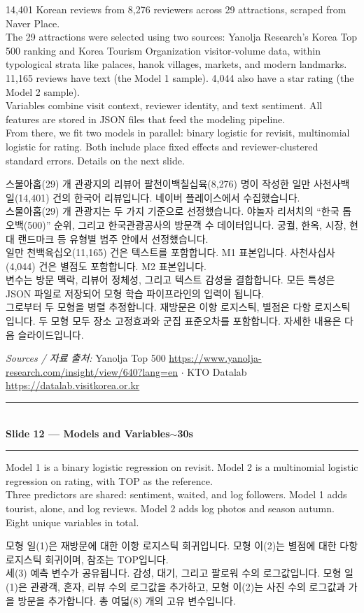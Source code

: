 \documentclass[10pt,a4paper]{article}
\newcommand{\sechead}[2]{%
  \vspace{6pt}%
  \noindent\rule{\linewidth}{0.6pt}\\[1pt]
  {\small\bfseries #1\hfill #2}\\[-3pt]
  \rule{\linewidth}{0.4pt}\par\vspace{2pt}%
}
\newcommand{\sent}[1]{#1\\[4pt]}
\newcommand{\bilingual}[2]{%
  \noindent%
  \begin{minipage}[t]{0.485\linewidth}
    \small #1
  \end{minipage}\hfill\vrule\hfill%
  \begin{minipage}[t]{0.483\linewidth}
    \small #2
  \end{minipage}\par\vspace{3pt}%
}
\begin{document}
\bilingual{%
\sent{14{,}401 Korean reviews from 8{,}276 reviewers across 29
attractions, scraped from Naver Place.}
\sent{The 29 attractions were selected using two sources: Yanolja
Research's Korea Top 500 ranking and Korea Tourism Organization
visitor-volume data, within typological strata like palaces, hanok
villages, markets, and modern landmarks.}
\sent{11{,}165 reviews have text (the Model 1 sample). 4{,}044 also have
a star rating (the Model 2 sample).}
\sent{Variables combine visit context, reviewer identity, and text
sentiment. All features are stored in JSON files that feed the modeling
pipeline.}
\sent{From there, we fit two models in parallel: binary logistic for
revisit, multinomial logistic for rating. Both include place fixed
effects and reviewer-clustered standard errors. Details on the next
slide.}
}{%
\sent{스물아홉(29) 개 관광지의 리뷰어 팔천이백칠십육(8{,}276) 명이
작성한 일만 사천사백일(14{,}401) 건의 한국어 리뷰입니다. 네이버
플레이스에서 수집했습니다.}
\sent{스물아홉(29) 개 관광지는 두 가지 기준으로 선정했습니다. 야놀자
리서치의 ``한국 톱 오백(500)'' 순위, 그리고 한국관광공사의 방문객 수
데이터입니다. 궁궐, 한옥, 시장, 현대 랜드마크 등 유형별 범주 안에서
선정했습니다.}
\sent{일만 천백육십오(11{,}165) 건은 텍스트를 포함합니다. M1 표본입니다.
사천사십사(4{,}044) 건은 별점도 포함합니다. M2 표본입니다.}
\sent{변수는 방문 맥락, 리뷰어 정체성, 그리고 텍스트 감성을 결합합니다.
모든 특성은 JSON 파일로 저장되어 모형 학습 파이프라인의 입력이 됩니다.}
\sent{그로부터 두 모형을 병렬 추정합니다. 재방문은 이항 로지스틱,
별점은 다항 로지스틱입니다. 두 모형 모두 장소 고정효과와 군집
표준오차를 포함합니다. 자세한 내용은 다음 슬라이드입니다.}
}

\vspace{2pt}
{\scriptsize\textit{Sources / 자료 출처:}
Yanolja Top 500 \url{https://www.yanolja-research.com/insight/view/640?lang=en}
$\cdot$ KTO Datalab \url{https://datalab.visitkorea.or.kr}}
\vspace{3pt}

\sechead{Slide 12 --- Models and Variables}{$\sim$30s}

\bilingual{%
\sent{Model 1 is a binary logistic regression on revisit. Model 2 is a
multinomial logistic regression on rating, with TOP as the reference.}
\sent{Three predictors are shared: sentiment, waited, and log followers.
Model 1 adds tourist, alone, and log reviews. Model 2 adds log photos
and season autumn. Eight unique variables in total.}
}{%
\sent{모형 일(1)은 재방문에 대한 이항 로지스틱 회귀입니다. 모형 이(2)는
별점에 대한 다항 로지스틱 회귀이며, 참조는 TOP입니다.}
\sent{세(3) 예측 변수가 공유됩니다. 감성, 대기, 그리고 팔로워 수의
로그값입니다. 모형 일(1)은 관광객, 혼자, 리뷰 수의 로그값을 추가하고,
모형 이(2)는 사진 수의 로그값과 가을 방문을 추가합니다. 총 여덟(8) 개의
고유 변수입니다.}
}
\end{document}

